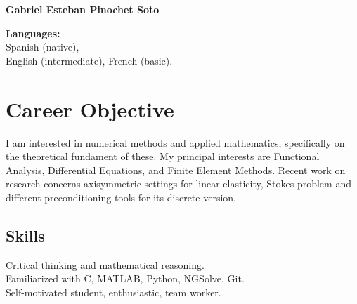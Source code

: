 \documentclass[12pt,letterpaper]{report}
\newcommand{\myname}{Gabriel Esteban Pinochet Soto}
\newcommand{\namefont}[1]{{\normalfont\bfseries\Huge{#1}}}
\begin{document}
    \raggedright{}

    \namefont{\myname}

    \vspace{1em}
    \begin{minipage}[t]{0.4\textwidth}
        {\bf Languages:}\\ Spanish (native), \\English (intermediate), French (basic). \\
    \end{minipage}
    \begin{minipage}[t]{0.4\textwidth}
    \end{minipage}
    \hfill

    \section*{Career Objective}

    I am interested in numerical methods and applied mathematics, specifically on the theoretical fundament of these.
    My principal interests are Functional Analysis, Differential Equations, and Finite Element Methods.
	\newline  \newline\noindent	
    Recent work on research concerns axisymmetric settings for linear elasticity, Stokes problem and different preconditioning tools for its discrete version.

    \subsection*{Skills}

    Critical thinking and mathematical reasoning.\\
    Familiarized with C, MATLAB, Python, NGSolve, Git.\\
    Self-motivated student, enthusiastic, team worker.
\end{document}
